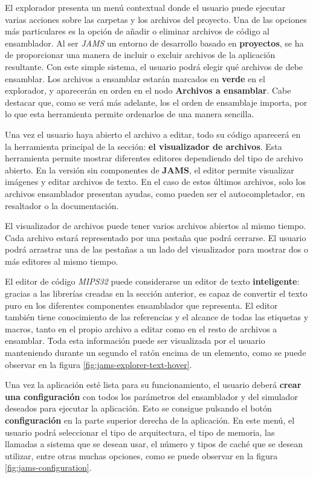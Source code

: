 El explorador presenta un menú contextual donde el usuario
puede ejecutar varias acciones sobre las carpetas y los archivos
del proyecto.
Una de las opciones más particulares es la opción de añadir o eliminar
archivos de código al ensamblador.
Al ser \textit{JAMS} un entorno de desarrollo basado en \textbf{proyectos},
se ha de proporcionar una manera de incluir o excluir archivos de
la aplicación resultante.
Con este simple sistema, el usuario podrá elegir qué archivos de debe ensamblar.
Los archivos a ensamblar estarán marcados en \textbf{verde} en el explorador,
y aparecerán en orden en el nodo \textbf{Archivos a ensamblar}.
Cabe destacar que, como se verá más adelante, los el orden de ensamblaje
importa, por lo que esta herramienta permite ordenarlos de una manera sencilla.

Una vez el usuario haya abierto el archivo a editar, todo su código
aparecerá en la herramienta principal de la sección: \textbf{el visualizador
de archivos}.
Esta herramienta permite mostrar diferentes editores dependiendo del tipo
de archivo abierto.
En la versión sin componentes de \textbf{JAMS}, el editor permite visualizar
imágenes y editar archivos de texto.
En el caso de estos últimos archivos, solo los archivos ensamblador presentan
ayudas, como pueden ser el autocompletador, en resaltador o la documentación.

El visualizador de archivos puede tener varios archivos abiertos
al mismo tiempo.
Cada archivo estará representado por una pestaña que podrá cerrarse.
El usuario podrá arrastrar una de las pestañas a un lado del visualizador
para mostrar dos o más editores al mismo tiempo.

El editor de código \textit{MIPS32} puede considerarse un editor
de texto \textbf{inteligente}: gracias a las librerías creadas en la sección
anterior, es capaz de convertir el texto puro en los diferentes componentes
ensamblador que representa.
El editor también tiene conocimiento de las referencias y el alcance de
todas las etiquetas y macros, tanto en el propio archivo a editar
como en el resto de archivos a ensamblar.
Toda esta información puede ser visualizada por el usuario manteniendo
durante un segundo el ratón encima de un elemento, como se puede observar
en la figura \ref{fig:jams-explorer-text-hover}.

Una vez la aplicación esté lista para su funcionamiento,
el usuario deberá \textbf{crear una configuración} con todos los parámetros
del ensamblador y del simulador deseados para ejecutar la aplicación.
Esto se consigue pulsando el botón \textbf{configuración} en la parte
superior derecha de la aplicación.
En este menú, el usuario podrá seleccionar el tipo de arquitectura,
el tipo de memoria, las llamadas a sistema que se desean usar,
el número y tipos de caché que se desean utilizar, entre otras
muchas opciones, como se puede observar en la figura \ref{fig:jams-configuration}.

